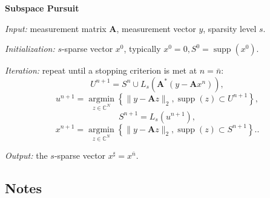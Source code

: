 \begin{mdframed}
    \label{subspacepursuit}
    \begin{center}
        \textbf{\textcolor[rgb]{1,0,0}{Subspace Pursuit}}
    \end{center}

    \emph{Input:} measurement matrix $\mathbf{A}$, measurement vector $y$, sparsity level $s$.

    \emph{Initialization:} $s$-sparse vector $x^0$, typically $x^0 = 0, S^0 = \mathop{\mathrm{supp}}(x^0)$.

    \emph{Iteration:} repeat until a stopping criterion is met at $n = \bar{n}$:
    \begin{equation}
        U^{n+1} = S^n \cup L_s(\mathbf{A}^*(y-\mathbf{A}x^n)), \tag{SP$_1$}
        \label{eqsp1}
    \end{equation}
    \begin{equation}
        u^{n+1} = \mathop{\mathrm{argmin}}\limits_{z \in \mathbb{C}^N} \left\{ \|y-\mathbf{A}z\|_2, \mathop{\mathrm{supp}}(z) \subset U^{n+1} \right\}, \tag{SP$_2$}
        \label{eqsp2}
    \end{equation}
    \begin{equation}
        S^{n+1} = L_{s} (u^{n+1}), \tag{SP$_3$}
        \label{eqsp3}
    \end{equation}
    \begin{equation}
        x^{n+1} = \mathop{\mathrm{argmin}}\limits_{z \in \mathbb{C}^N} \left\{ \|y - \mathbf{A}z\|_2, \mathop{\mathrm{supp}}(z) \subset S^{n+1} \right\}. \tag{SP$_4$}.
        \label{eqsp4}
    \end{equation}

    \emph{Output:} the $s$-sparse vector $x^{\sharp} = x^{\bar{n}}$.
\end{mdframed}

\subsection{Notes}


